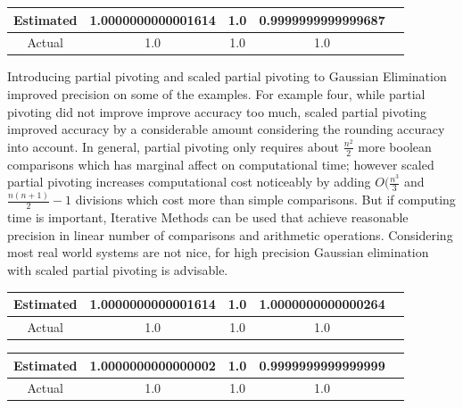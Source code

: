 \documentclass[11pt]{article}	%
\begin{document}
\begin{center}
	 \label{tab:title}
    \begin{tabular}{||c|c|c|c|c||}
        \hline
        \multirow{2}{5em}{Estimated} & 1.0000000000001614 & 1.0 &  0.9999999999999687 \\ [.25em]
        \hline\hline
        \multirow{2}{5em}{Actual} & 1.0 & 1.0 & 1.0 \\ [.25em]
        \hline
    \end{tabular}
\end{center}
			
Introducing partial pivoting and scaled partial pivoting to Gaussian Elimination improved precision on some of the examples. For example four, while partial pivoting did not improve improve accuracy too much, scaled partial pivoting improved accuracy by a considerable amount considering the rounding accuracy into account. In general, partial pivoting only requires about $\frac{n^2}{2}$ more boolean comparisons which has marginal affect on computational time; however scaled partial pivoting increases computational cost noticeably by adding $O(\frac{n^3}{3}$ and $\frac{n(n+1)}{2} - 1$ divisions which cost more than simple comparisons. But if computing time is important, Iterative Methods can be used that achieve reasonable precision in linear number of comparisons and arithmetic operations. Considering most real world systems are not nice, for high precision Gaussian elimination with scaled partial pivoting is advisable.  

\begin{center}
	 \label{tab:title}
    \begin{tabular}{||c|c|c|c|c||}
        \hline
        \multirow{2}{5em}{Estimated} & 1.0000000000001614 & 1.0 &  1.0000000000000264 \\ [.25em]
        \hline\hline
        \multirow{2}{5em}{Actual} & 1.0 & 1.0 & 1.0 \\ [.25em]
        \hline
    \end{tabular}
\end{center}

\begin{center}
	 \label{tab:title}
    \begin{tabular}{||c|c|c|c|c||}
        \hline
        \multirow{2}{5em}{Estimated} & 1.0000000000000002 & 1.0 &  0.9999999999999999 \\ [.25em]
        \hline\hline
        \multirow{2}{5em}{Actual} & 1.0 & 1.0 & 1.0 \\ [.25em]
        \hline
    \end{tabular}
\end{center}
\end{document}
